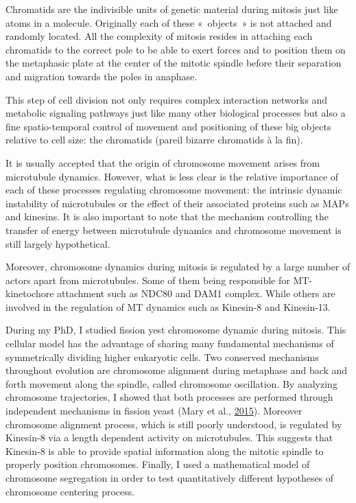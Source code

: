 \documentclass[12pt,a4paper,twoside,openright]{book}
\begin{document}
Chromatids are the indivisible units of genetic material during mitosis
just like atoms in a molecule. Originally each of these «~objects~» is
not attached and randomly located. All the complexity of mitosis resides
in attaching each chromatids to the correct pole to be able to exert
forces and to position them on the metaphasic plate at the center of the
mitotic spindle before their separation and migration towards the poles
in anaphase.

This step of cell division not only requires complex interaction
networks and metabolic signaling pathways just like many other
biological processes but also a fine spatio-temporal control of movement
and positioning of these big objects relative to cell size: the
chromatids (pareil bizarre chromatids à la fin).

It is usually accepted that the origin of chromosome movement arises
from microtubule dynamics. However, what is less clear is the relative
importance of each of these processes regulating chromosome movement:
the intrinsic dynamic instability of microtubules or the effect of their
associated proteins such as MAPs and kinesins. It is also important to
note that the mechanism controlling the transfer of energy between
microtubule dynamics and chromosome movement is still largely
hypothetical.

Moreover, chromosome dynamics during mitosis is regulated by a large
number of actors apart from microtubules. Some of them being responsible
for MT-kinetochore attachment such as NDC80 and DAM1 complex. While
others are involved in the regulation of MT dynamics such as Kinesin-8
and Kinesin-13.

During my PhD, I studied fission yest chromosome dynamic during mitosis.
This cellular model has the advantage of sharing many fundamental
mechanisms of symmetrically dividing higher eukaryotic cells. Two
conserved mechanisms throughout evolution are chromosome alignment
during metaphase and back and forth movement along the spindle, called
chromosome oscillation. By analyzing chromosome trajectories, I showed
that both processes are performed through independent mechanisms in
fission yeast (Mary et al., \protect\hyperlink{ref-Mary2015}{2015}).
Moreover chromosome alignment process, which is still poorly understood,
is regulated by Kinesin-8 via a length dependent activity on
microtubules. This suggests that Kinesin-8 is able to provide spatial
information along the mitotic spindle to properly position chromosomes.
Finally, I used a mathematical model of chromosome segregation in order
to test quantitatively different hypotheses of chromosome centering
process.
\end{document}
